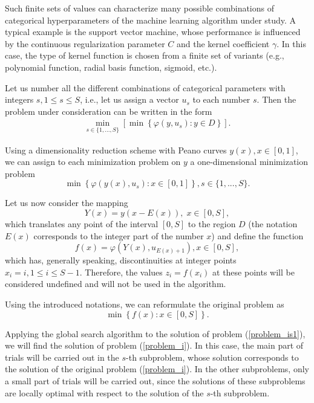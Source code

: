 \documentclass[preprint,12pt]{elsarticle}
\begin{document}
Such finite sets of values can characterize many possible combinations of categorical hyperparameters of the machine learning algorithm under study. A typical example is the support vector machine, whose performance is influenced by the continuous regularization parameter $C$ and the kernel coefficient $\gamma$. In this case, the type of kernel function is chosen from a finite set of variants (e.g., polynomial function, radial basis function, sigmoid, etc.). 

Let us number all the different combinations of categorical parameters with integers $s, 1\leq s \leq S$, i.e., let us assign a vector $u_s$ to each number $s$. Then the problem under consideration can be written in the form
\begin{gather}\label{problem_is}
 \min_{s\in\{1,...,S\}}\left[\min{\left\{ \varphi(y,u_s) : y\in D \right\}}\right].
\end{gather}

Using a dimensionality reduction scheme with Peano curves $y(x), x\in [0,1]$,  we can assign to each minimization problem on $y$ a one-dimensional minimization problem
\[
 \min{\left\{ \varphi(y(x),u_s): x \in [0,1] \right\}}, s \in \{1,...,S\}.
\]

Let us now consider the mapping
\[
Y(x)=y(x-E(x)), \; x\in[0,S],
\]
which translates any point of the interval $[0,S]$ to the region $D$ (the notation $E(x)$ corresponds to the integer part of the number $x$) and define the function
\[
f(x) = \varphi(Y(x),u_{E(x)+1}), x\in[0,S],
\]
which has, generally speaking, discontinuities at integer points $x_i = i, 1 \leq i \leq S-1$.
Therefore, the values $z_i = f(x_i)$ at these points will be considered undefined and will not be used in the algorithm.

Using the introduced notations, we can reformulate the original problem as
\begin{equation}\label{problem_is1}
\min \left\{f(x): x \in [0,S] \right\}.
\end{equation}

Applying the global search algorithm to the solution of problem (\ref{problem_is1}), we will find the solution of problem (\ref{problem_i}). In this case, the main part of trials will be carried out in the $s$-th subproblem, whose solution corresponds to the solution of the original problem (\ref{problem_i}). In the other subproblems, only a small part of trials will be carried out, since the solutions of these subproblems are locally optimal with respect to the solution of the $s$-th subproblem.
\end{document}
